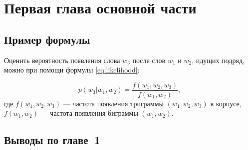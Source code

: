 \chapter{Первая глава основной части}\label{chap:1}

\section{Пример формулы}

Оценить вероятность появления слова $w_3$ после слов $w_1$ и $w_2$, идущих подряд, можно при помощи формулы \ref{eq:likelihood}:

\begin{equation}
  p(w_3|w_1,w_2) = \frac{f(w_1, w_2, w_3)}{f(w_1, w_2)},
  \label{eq:likelihood}
\end{equation}
%
где $f(w_1, w_2, w_3)$ --- частота появления триграммы $(w_1, w_2, w_3)$ в корпусе, $f(w_1, w_2)$ --- частота появления биграммы $(w_1, w_2)$.

\section{Выводы по главе~1}
